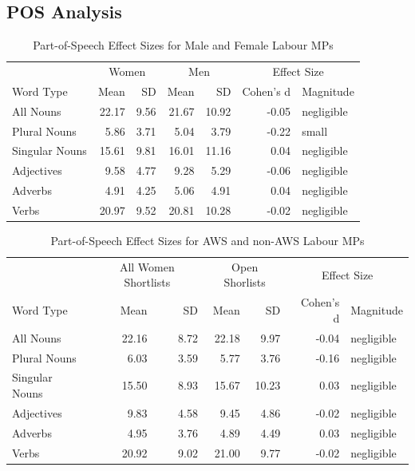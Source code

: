 \documentclass[]{article}
\begin{document}
\hypertarget{pos-analysis}{%
\subsection{POS Analysis}\label{pos-analysis}}

\begin{table}

\caption{\label{tab:pos-gender-table}Part-of-Speech Effect Sizes for Male and Female Labour MPs}
\centering
\begin{tabular}[t]{lrrrrrl}
\toprule
\multicolumn{1}{c}{ } & \multicolumn{2}{c}{Women} & \multicolumn{2}{c}{Men} & \multicolumn{2}{c}{Effect Size} \\
\cmidrule(l{2pt}r{2pt}){2-3} \cmidrule(l{2pt}r{2pt}){4-5} \cmidrule(l{2pt}r{2pt}){6-7}
Word Type & Mean & SD & Mean & SD & Cohen's d & Magnitude\\
\midrule
All Nouns & 22.17 & 9.56 & 21.67 & 10.92 & -0.05 & negligible\\
\hspace{1em}Plural Nouns & 5.86 & 3.71 & 5.04 & 3.79 & -0.22 & small\\
\hspace{1em}Singular Nouns & 15.61 & 9.81 & 16.01 & 11.16 & 0.04 & negligible\\
Adjectives & 9.58 & 4.77 & 9.28 & 5.29 & -0.06 & negligible\\
Adverbs & 4.91 & 4.25 & 5.06 & 4.91 & 0.04 & negligible\\
Verbs & 20.97 & 9.52 & 20.81 & 10.28 & -0.02 & negligible\\
\bottomrule
\end{tabular}
\end{table}

\begin{table}

\caption{\label{tab:pos-sl-table}Part-of-Speech Effect Sizes for AWS and non-AWS Labour MPs}
\centering
\begin{tabular}[t]{lrrrrrl}
\toprule
\multicolumn{1}{c}{ } & \multicolumn{2}{c}{All Women Shortlists} & \multicolumn{2}{c}{Open Shorlists} & \multicolumn{2}{c}{Effect Size} \\
\cmidrule(l{2pt}r{2pt}){2-3} \cmidrule(l{2pt}r{2pt}){4-5} \cmidrule(l{2pt}r{2pt}){6-7}
Word Type & Mean & SD & Mean & SD & Cohen's d & Magnitude\\
\midrule
All Nouns & 22.16 & 8.72 & 22.18 & 9.97 & -0.04 & negligible\\
\hspace{1em}Plural Nouns & 6.03 & 3.59 & 5.77 & 3.76 & -0.16 & negligible\\
\hspace{1em}Singular Nouns & 15.50 & 8.93 & 15.67 & 10.23 & 0.03 & negligible\\
Adjectives & 9.83 & 4.58 & 9.45 & 4.86 & -0.02 & negligible\\
Adverbs & 4.95 & 3.76 & 4.89 & 4.49 & 0.03 & negligible\\
Verbs & 20.92 & 9.02 & 21.00 & 9.77 & -0.02 & negligible\\
\bottomrule
\end{tabular}
\end{table}
\end{document}
